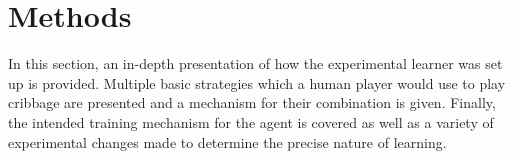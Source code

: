\section{Methods}
\label{sec:dm}


In this section,
an in-depth presentation of how the experimental learner was set up is provided.
%
Multiple basic strategies which a human player would use to play cribbage are
presented and a mechanism for their combination is given.
%
Finally,
the intended training mechanism for the agent is covered
as well as a variety of experimental changes made to determine the precise
nature of learning.



